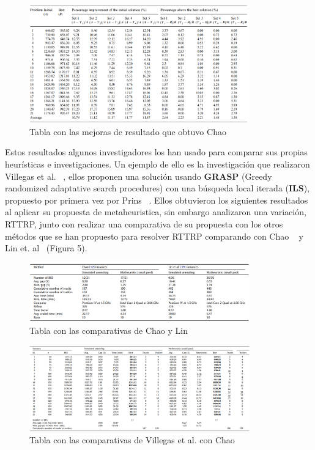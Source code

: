 \documentclass[letter, 10pt]{article}
\begin{document}
\begin{figure}[htbp!]
\label{Tabla2}
\centering
\includegraphics[width=0.85\textwidth]{fig4.png}
\caption{Tabla con las mejoras de resultado que obtuvo Chao ~\cite{Chao}} 
\end{figure}

Estos resultados algunos investigadores los han usado para comparar sus propias heurísticas e investigaciones. Un ejemplo de ello es la investigación que realizaron Villegas et al. ~\cite{Villegas}, ellos proponen una solución usando \textbf{GRASP} (Greedy randomized adaptative search procedures) con una búsqueda local iterada (\textbf{ILS}), propuesto por primera vez por Prins ~\cite{GRASP}. Ellos obtuvieron los siguientes resultados al aplicar su propuesta de metaheuristica, sin embargo analizaron una variación, RTTRP, junto con realizar una comparativa de su propuesta con los otros métodos que se han propuesto para resolver RTTRP comparando con Chao ~\cite{Chao} y Lin et. al ~\cite{TTRPTW}(Figura 5).

\begin{figure}[htbp!]
\label{Tabla4}
\centering
\includegraphics[width=0.85\textwidth]{Images/fig8.png}
\caption{Tabla con las comparativas de  Chao y Lin ~\cite{Villegas}} 
\end{figure}

\begin{figure}[htbp!]
\label{Tabla5}
\centering
\includegraphics[width=0.85\textwidth]{Images/fig6.png}
\caption{Tabla con las comparativas de Villegas et al. con Chao ~\cite{Villegas}} 
\end{figure}
\end{document}
